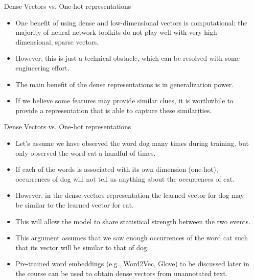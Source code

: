 \documentclass[handout]{beamer}
\begin{document}
\begin{frame}{Dense Vectors vs. One-hot representations}
\begin{scriptsize}


\begin{itemize}

\item One benefit of using dense and low-dimensional vectors is computational: the majority of neural network toolkits do not play well with very high-dimensional, sparse vectors.
\item However, this is just a technical obstacle, which can be resolved with some engineering effort.

\item The main benefit of the dense representations is in generalization power.

\item If we believe some features may provide similar clues, it is worthwhile to provide a representation that is able to capture these similarities. 

\end{itemize}

\end{scriptsize}
\end{frame}



\begin{frame}{Dense Vectors vs. One-hot representations}
\begin{scriptsize}


\begin{itemize}

\item Let's assume we have observed the word dog many times during
training, but only observed the word cat a handful of times. 

\item If each of the words is associated with its own dimension (one-hot), occurrences of dog will not tell us anything about the occurrences of cat. 

\item However, in the dense vectors representation the learned vector for dog may be similar to the learned vector for cat.

\item This will allow the model to share statistical strength between the two events. 

\item This argument assumes that we saw enough occurrences of the word cat such that its vector will be similar to that of dog.

\item Pre-trained word embeddings (e.g., Word2Vec, Glove) to be discussed later in the course can be used to obtain dense vectors from unannotated text.


\end{itemize}

\end{scriptsize}
\end{frame}
\end{document}
